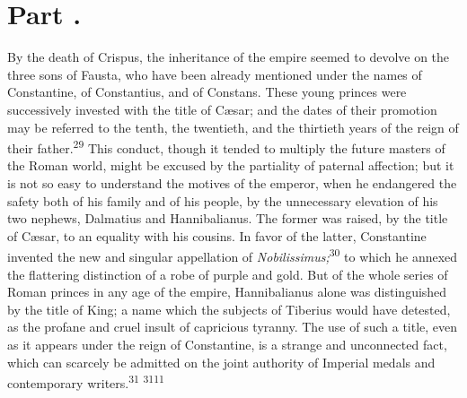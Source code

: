 



\section{Part \thesection.}

By the death of Crispus, the inheritance of the empire seemed to
devolve on the three sons of Fausta, who have been already
mentioned under the names of Constantine, of Constantius, and of
Constans. These young princes were successively invested with the
title of Cæsar; and the dates of their promotion may be referred
to the tenth, the twentieth, and the thirtieth years of the reign
of their father.\textsuperscript{29} This conduct, though it tended to multiply
the future masters of the Roman world, might be excused by the
partiality of paternal affection; but it is not so easy to
understand the motives of the emperor, when he endangered the
safety both of his family and of his people, by the unnecessary
elevation of his two nephews, Dalmatius and Hannibalianus. The
former was raised, by the title of Cæsar, to an equality with his
cousins. In favor of the latter, Constantine invented the new and
singular appellation of \textit{Nobilissimus;}\textsuperscript{30} to which he annexed
the flattering distinction of a robe of purple and gold. But of
the whole series of Roman princes in any age of the empire,
Hannibalianus alone was distinguished by the title of King; a
name which the subjects of Tiberius would have detested, as the
profane and cruel insult of capricious tyranny. The use of such a
title, even as it appears under the reign of Constantine, is a
strange and unconnected fact, which can scarcely be admitted on
the joint authority of Imperial medals and contemporary writers.\textsuperscript{31} \textsuperscript{3111}

